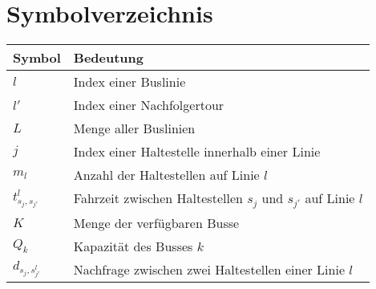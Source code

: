 \chapter*{Symbolverzeichnis}

\begin{longtable}[l]{@{}>{\centering\arraybackslash}p{5cm}p{11cm}@{}}
\textbf{Symbol} & \textbf{Bedeutung} \\
\midrule
$l$ & Index einer Buslinie \\
$l'$ & Index einer Nachfolgertour \\
$L$ & Menge aller Buslinien \\
$j$ & Index einer Haltestelle innerhalb einer Linie \\
$m_l$ & Anzahl der Haltestellen auf Linie $l$ \\
$t_{s_j,s_{j'}}^l$ & Fahrzeit zwischen Haltestellen $s_j$ und $s_{j'}$ auf Linie $l$ \\
$K$ & Menge der verfügbaren Busse \\
$Q_k$ & Kapazität des Busses $k$ \\
$d_{s_j,s_{j'}^l}$ & Nachfrage zwischen zwei Haltestellen einer Linie $l$ \\
\end{longtable}

